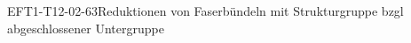 
\begin{DEF}{EFT1-T12-02-63}{Reduktionen von Faserbündeln mit Strukturgruppe bzgl abgeschlossener Untergruppe}
\end{DEF}
